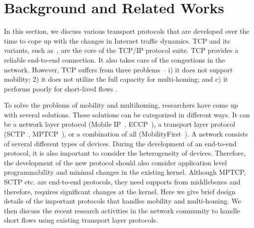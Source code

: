 \section{Background and Related Works}
%
In this section, we discuss various transport protocols that are developed over the time to cope up with the changes in Internet traffic dynamics. TCP and its variants, such as~\cite{wang2014achieving,lukaseder2016comparison,wang2013cubic,de2016throughput}, are the core of the TCP/IP protocol suite. TCP provides a reliable end-to-end connection. It also takes care of the congestions in the network. However, TCP suffers from three problems -- i) it does not support mobility; 2) it does not utilize the full capacity for multi-homing; and c) it performs poorly for short-lived flows \cite{de2016throughput,islam2016start}.

To solve the problems of mobility and multihoming, researchers have come up with several solutions. These solutions can be categorized in different ways. It can be a network layer protocol (Mobile IP~\cite{MobileIp}, ECCP~\cite{arye2012formally}), a transport layer protocol (SCTP~\cite{iyengar2006concurrent}, MPTCP~\cite{mptcpsurvey}), or a combination of all (MobilityFirst~\cite{MobilityFirst,raychaudhuri2012mobilityfirst,venkataramani2014mobilityfirst}). A network consists of several different types of devices. During the development of an end-to-end protocol, it is also important to consider the heterogeneity of devices. Therefore, the development of the new protocol should also consider application level programmability and minimal changes in the existing kernel. Although MPTCP, SCTP etc. are end-to-end protocols, they need supports from middleboxes and therefore, requires significant changes at the kernel. Here we give brief design details of the important protocols that handles mobility and multi-homing. We then discuss the recent research activities in the network community to handle short flows using existing transport layer protocols. 


